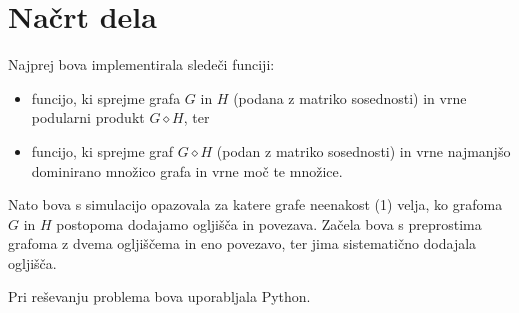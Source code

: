 \documentclass[a4paper,12pt]{article}
\begin{document}
\section{Načrt dela}
Najprej bova implementirala sledeči funciji:
    \begin{itemize}
        \item funcijo, ki sprejme grafa $G$ in $H$ (podana z matriko sosednosti) in vrne podularni produkt $G \diamond H$, ter
        \item funcijo, ki sprejme graf $G \diamond H$ (podan z matriko sosednosti) in vrne najmanjšo dominirano množico grafa in vrne moč te množice.
    \end{itemize}

Nato bova s simulacijo opazovala za katere grafe neenakost (1) velja, ko grafoma $G$ in $H$ postopoma dodajamo ogljišča in povezava. Začela bova 
s preprostima grafoma z dvema ogljiščema in eno povezavo, ter jima sistematično dodajala ogljišča.

Pri reševanju problema bova uporabljala Python.
\end{document}

